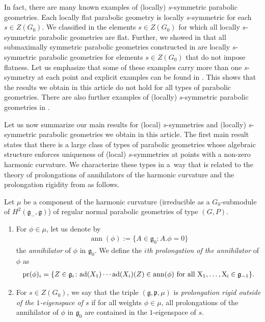 \documentclass[pdftex]{sigma}
\newcommand{\fg}{\mathfrak g}
\newcommand{\fp}{\mathfrak p}
\newcommand{\ad}{{\rm ad}}
\numberwithin{equation}{section}
\begin{document}
In fact, there are many known examples of (locally) $s$-symmetric parabolic geometries. Each locally f\/lat parabolic geometry is locally $s$-symmetric for each $s\in Z(G_0)$. We classif\/ied in \cite{GZ3} the elements $s\in Z(G_0)$ for which all locally $s$-symmetric parabolic geometries are f\/lat. Further, we showed in \cite[Proposition 6.1]{GZ2} that all submaximally symmetric parabolic geometries constructed in \cite[Section 4.1]{KT} are locally $s$-symmetric parabolic geometries for elements $s\in Z(G_0)$ that do not impose f\/latness. Let us emphasize that some of these examples carry more than one $s$-symmetry at each point and explicit examples can be found in \cite[Section 6]{GZ2}.
This shows that the results we obtain in this article do not hold for all types of parabolic geometries.
There are also further examples of (locally) $s$-symmetric parabolic geometries in \cite{BFG,G2,G3,GZ4,Podesta}.

Let us now summarize our main results for (local) $s$-symmetries and (locally) $s$-symmetric parabolic geometries we obtain in this article. The f\/irst main result states that there is a large class of types of parabolic geometries whose algebraic structure enforces uniqueness of (local) $s$-symmetries at points with a non-zero harmonic curvature. We characterize these types in a~way that is related to the theory of prolongations of annihilators of the harmonic curvature and the prolongation rigidity from \cite[Section~3.4]{KT} as follows.

\begin{Definition}\label{prolong} \label{prolongation-rigid}
Let $\mu$ be a component of the harmonic curvature (irreducible as a $G_0$-submodule of $H^2(\fg_-,\fg)$) of regular normal parabolic geometries of type $(G,P)$.
\begin{enumerate}\itemsep=0pt
\item For $\phi\in \mu$, let us denote by
\begin{gather*}\operatorname{ann}(\phi):=\{A\in \fg_0\colon A. \phi=0\}\end{gather*}
the \emph{annihilator} of $\phi$ in $\fg_{0}$. We def\/ine the \emph{$i$th prolongation of the annihilator} of $\phi$ as
\begin{gather*}\operatorname{pr}(\phi)_i=\{Z\in \fg_{i}\colon \ad(X_1)\cdots \ad(X_i)(Z)\in \operatorname{ann}(\phi) \ \rm{ for\ all\ } X_1,\dots, X_i\in\fg_{-1}\}.\end{gather*}
\item For $s\in Z(G_0)$, we say that the triple $(\fg,\fp,\mu)$ is \emph{prolongation rigid outside of the $1$-eigen\-space of $s$} if for all weights $\phi\in \mu$, all prolongations of the annihilator of $\phi$ in $\fg_0$ are contained in the $1$-eigenspace of $s$.
\end{enumerate}
\end{Definition}
\end{document}
